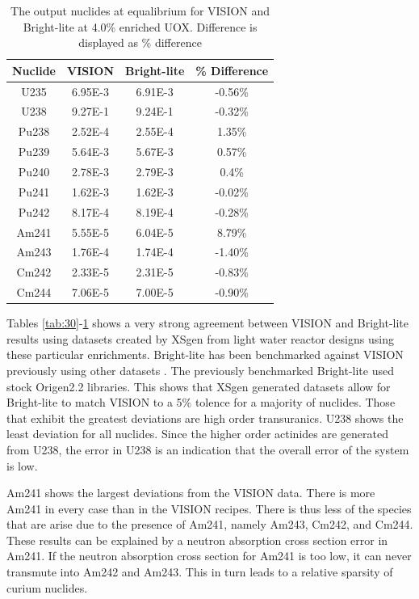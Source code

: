 \documentclass{article}
\begin{document}
\begin{table}[!htb]
\centering
\small
\caption{The output nuclides at equalibrium for VISION and Bright-lite at 4.0\% enriched UOX. Difference is displayed as \% difference}
\label{tab:40}
\vspace{0.5em}
\begin{tabular}{cccc}
Nuclide & VISION & Bright-lite & \% Difference \\
\hline
U235 & 6.95E-3 & 6.91E-3 & -0.56\%\\
U238 & 9.27E-1 & 9.24E-1 & -0.32\%\\
Pu238 & 2.52E-4 & 2.55E-4 & 1.35\%\\
Pu239 & 5.64E-3 & 5.67E-3 & 0.57\%\\
Pu240 & 2.78E-3 & 2.79E-3 & 0.4\%\\
Pu241 & 1.62E-3  & 1.62E-3 & -0.02\%\\
Pu242 & 8.17E-4  & 8.19E-4 & -0.28\%\\
Am241 & 5.55E-5 & 6.04E-5 & 8.79\%\\
Am243 & 1.76E-4 & 1.74E-4 & -1.40\%\\
Cm242 & 2.33E-5 & 2.31E-5 & -0.83\%\\
Cm244 & 7.06E-5 & 7.00E-5 & -0.90\%\\
\end{tabular}
\end{table}

Tables \ref{tab:30}-\ref{tab:40} shows a very strong agreement between VISION and Bright-lite
results using datasets created by XSgen from light water reactor designs using these particular
enrichments. Bright-lite has been benchmarked against VISION previously using other datasets
\cite{brightlite}. The previously benchmarked Bright-lite used stock Origen2.2 libraries\cite{origen2}. This shows that
XSgen generated datasets allow for Bright-lite to match VISION to a 5\% tolence for a
majority of nuclides. Those that exhibit the greatest deviations are high order transuranics. U238 shows the least
deviation for all nuclides. Since the higher order actinides are generated from U238, the error in U238
is an indication that the overall error of the system is low. 

Am241 shows the largest deviations from the VISION data. There is more Am241 in every
case than in the VISION recipes. There is thus less of the species that are arise due to
the presence of Am241, namely Am243, Cm242, and Cm244. These results can be explained by a
neutron absorption cross section error in Am241. If the neutron absorption cross section for
Am241 is too low, it can never transmute into Am242 and Am243. This in turn leads to a
relative sparsity of curium nuclides.
\end{document}
